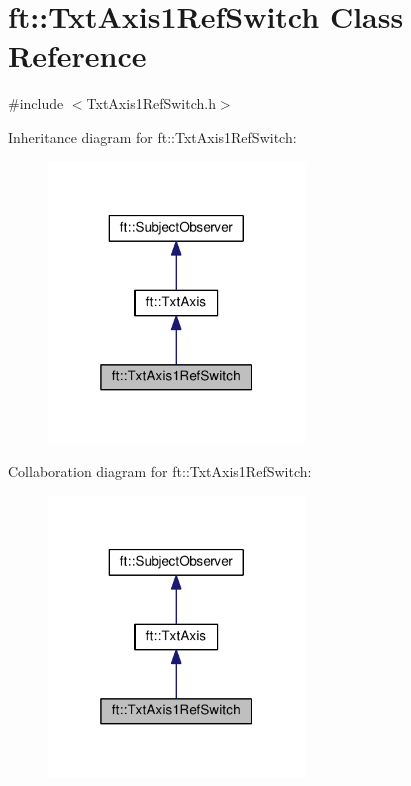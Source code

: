 \hypertarget{classft_1_1_txt_axis1_ref_switch}{}\section{ft\+:\+:Txt\+Axis1\+Ref\+Switch Class Reference}
\label{classft_1_1_txt_axis1_ref_switch}


{\ttfamily \#include $<$Txt\+Axis1\+Ref\+Switch.\+h$>$}



Inheritance diagram for ft\+:\+:Txt\+Axis1\+Ref\+Switch\+:
\nopagebreak
\begin{figure}[H]
\begin{center}
\leavevmode
\includegraphics[width=193pt]{classft_1_1_txt_axis1_ref_switch__inherit__graph}
\end{center}
\end{figure}


Collaboration diagram for ft\+:\+:Txt\+Axis1\+Ref\+Switch\+:
\nopagebreak
\begin{figure}[H]
\begin{center}
\leavevmode
\includegraphics[width=193pt]{classft_1_1_txt_axis1_ref_switch__coll__graph}
\end{center}
\end{figure}
